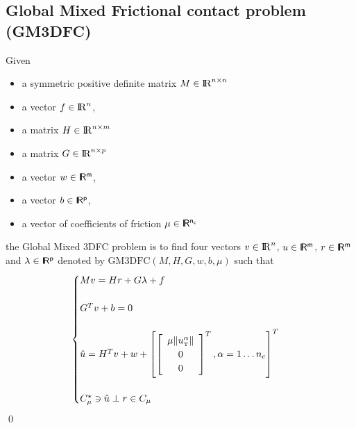 \documentclass[a4paper,10pt]{article}
\begin{document}
\subsection{Global  Mixed Frictional contact problem (GM3DFC)}
\begin{definition}
  Given
  \begin{itemize}
    \item a symmetric positive definite matrix ${M} \in \mathrm{I\!R}^{n \times n}$
    \item a vector $ {f} \in \mathrm{I\!R}^n$,
    \item a matrix  ${H} \in \mathrm{I\!R}^{n \times m}$
    \item a matrix  ${G} \in \mathrm{I\!R}^{n \times p}$
     \item a vector $w \in \rm\sf I\!R^{m}$,
     \item a vector $b \in \rm\sf I\!R^{p}$,
    \item a vector of coefficients of friction $\mu \in \rm\sf I\!R^{n_c}$
  \end{itemize}
 the Global Mixed 3DFC problem  is to find four vectors $ {v} \in \mathrm{I\!R}^n$, $u\in\rm\sf I\!R^m$, $r\in \rm\sf I\!R^m$ and $\lambda \in \rm\sf I\!R^p$ denoted by $\mathrm{GM3DFC}(M,H,G,w,b,\mu)$  such that
\begin{equation}\label{eq:lcp1}
  \begin{cases}
    M v = {H} {r} + G\lambda + {f} \\ \\
    G^T v +b =0 \\ \\
    \hat u = H^T v + w +\left[
      \left[\begin{array}{c}
        \mu \|u^\alpha_{\hbox{\tiny{T}}}\|\\
        0 \\
        0
      \end{array}\right]^T, \alpha = 1 \ldots n_c
\right]^T \\ \\
    C^\star_{\mu} \ni {\hat u} \perp r \in C_{\mu}
  \end{cases}
\end{equation}
\qed
\end{definition}
\end{document}
